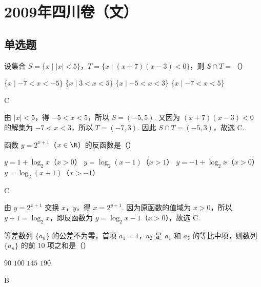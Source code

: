 \chapter{2009年四川卷（文）}

\section{单选题}

\begin{problem}
设集合 \(S = \{x \mid |x| < 5\}\)，\(T = \{x \mid (x + 7)(x - 3) < 0\}\)，则 \(S \cap T =\)（\quad）

\choices
    {\(\{x\mid -7 < x < -5\}\)}
    {\(\{x\mid 3 < x < 5\}\)}
    {\(\{x\mid -5 < x < 3\}\)}
    {\(\{x\mid -7 < x < 5\}\)}
\end{problem}

\begin{answer}
C
\end{answer}

\begin{solution}
由 \(|x|<5\)，得 \(-5<x<5\)，所以 \(S=(-5,5)\). 又因为
\((x+7)(x-3)<0\) 的解集为 \(-7<x<3\)，所以 \(T=(-7,3)\). 因此
\(S\cap T=(-5,3)\)，故选 C.
\end{solution}

\begin{problem}
函数 \(y = 2^{x + 1}\)（\(x \in \R\)）的反函数是（\quad）

\choices
    {\(y = 1 + \log_2 x\)（\(x > 0\)）}
    {\(y = \log_2(x - 1)\)（\(x > 1\)）}
    {\(y = -1 + \log_2 x\)（\(x > 0\)）}
    {\(y = \log_2(x + 1)\)（\(x > -1\)）}
\end{problem}

\begin{answer}
C
\end{answer}

\begin{solution}
由 \(y=2^{x+1}\) 交换 \(x\)，\(y\)，得 \(x=2^{y+1}\). 因为原函数的值域为
\(x>0\)，所以 \(y+1=\log_2x\)，即反函数为
\(y=\log_2x-1\)（\(x>0\)），故选 C.
\end{solution}

\begin{problem}
等差数列 \(\{a_n\}\) 的公差不为零，首项 \(a_1 = 1\)，\(a_2\) 是 \(a_1\) 和 \(a_5\) 的等比中项，则数列 \(\{a_n\}\) 的前 10 项之和是（\quad）

\choices
    {\(90\)}
    {\(100\)}
    {\(145\)}
    {\(190\)}
\end{problem}

\begin{answer}
B
\end{answer}

